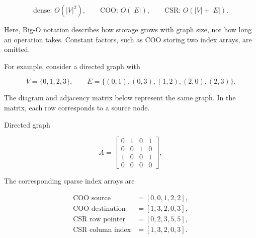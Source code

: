\begin{equation}
  \text{dense: }O(|V|^2), \qquad
  \text{COO: }O(|E|), \qquad
  \text{CSR: }O(|V|+|E|).
  \label{eq:graph-storage-complexity}
\end{equation}

Here, Big-O notation describes how storage grows with graph size, not how long
an operation takes. Constant factors, such as COO storing two index arrays, are
omitted.

For example, consider a directed graph with

\[
  V=\{0,1,2,3\}, \qquad
  E=\{(0,1),(0,3),(1,2),(2,0),(2,3)\}.
\]

\noindent\begin{minipage}{\linewidth}
The diagram and adjacency matrix below represent the same graph. In the matrix,
each row corresponds to a source node.

\begin{center}
  \begin{minipage}[c]{0.38\linewidth}
    \centering

    \small Directed graph
  \end{minipage}%
  \hfill
  \begin{minipage}[c]{0.56\linewidth}
    \begin{equation}
      A =
      \begin{bmatrix}
        0 & 1 & 0 & 1 \\
        0 & 0 & 1 & 0 \\
        1 & 0 & 0 & 1 \\
        0 & 0 & 0 & 0
      \end{bmatrix},
      \label{eq:example-adjacency}
    \end{equation}
  \end{minipage}
\end{center}
\end{minipage}

\noindent\begin{minipage}{\linewidth}
The corresponding sparse index arrays are

\begin{align*}
  \text{COO source}      &= [0,0,1,2,2], \\
  \text{COO destination} &= [1,3,2,0,3], \\
  \text{CSR row pointer} &= [0,2,3,5,5], \\
  \text{CSR column index} &= [1,3,2,0,3].
\end{align*}
\end{minipage}


